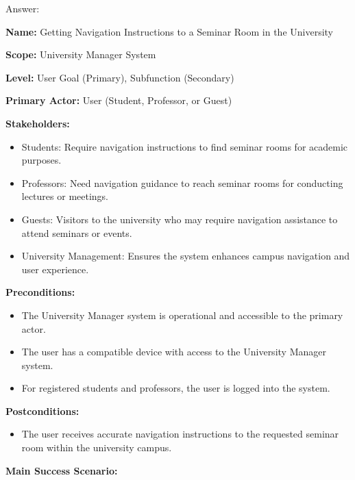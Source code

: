 \documentclass[article,onecolumn]{IEEEtran}
\begin{document}
Answer:
\begin{framed}
	\small
	\textbf{Name:} Getting Navigation Instructions to a Seminar Room in the University
	
	\textbf{Scope:} University Manager System
	
	\textbf{Level:} User Goal (Primary), Subfunction (Secondary)
	
	\textbf{Primary Actor:} User (Student, Professor, or Guest)
	
	\textbf{Stakeholders:}
	
	\begin{itemize}
		\item Students: Require navigation instructions to find seminar rooms for academic purposes.
		\item Professors: Need navigation guidance to reach seminar rooms for conducting lectures or meetings.
		\item Guests: Visitors to the university who may require navigation assistance to attend seminars or events.
		\item University Management: Ensures the system enhances campus navigation and user experience.
	\end{itemize}
	
	\textbf{Preconditions:}
	
	\begin{itemize}
		\item The University Manager system is operational and accessible to the primary actor.
		\item The user has a compatible device with access to the University Manager system.
		\item For registered students and professors, the user is logged into the system.
	\end{itemize}
	
	\textbf{Postconditions:}
	
	\begin{itemize}
		\item The user receives accurate navigation instructions to the requested seminar room within the university campus.
	\end{itemize}
	
	\textbf{Main Success Scenario:}
	

\end{framed}
\end{document}
